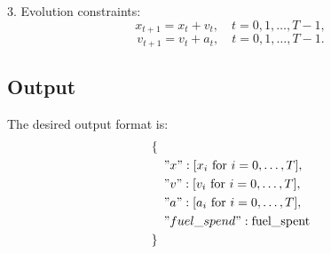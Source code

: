 \documentclass{article}
\begin{document}
3. Evolution constraints:
   \[
   x_{t+1} = x_t + v_t, \quad t=0,1,\ldots,T-1,
   \]
   \[
   v_{t+1} = v_t + a_t, \quad t=0,1,\ldots,T-1.
   \]

\subsection*{Output}
The desired output format is:
\[
\begin{align*}
    &\{ \\
    &\quad "x": [x_i \text{ for } i = 0, \ldots, T], \\
    &\quad "v": [v_i \text{ for } i = 0, \ldots, T], \\
    &\quad "a": [a_i \text{ for } i = 0, \ldots, T], \\
    &\quad "fuel\_spend": \text{fuel\_spent} \\
    &\}
\end{align*}
\]
\end{document}
